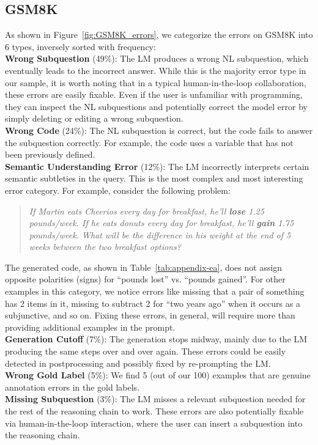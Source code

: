 \documentclass[11pt]{article}
\begin{document}
\subsection{GSM8K}
\label{sec:appendix_gsm8k_error_analysis}






As shown in Figure~\ref{fig:GSM8K_errors}, we categorize the errors on GSM8K into 6 types, inversely sorted with frequency:\\
\textbf{Wrong Subquestion} (49\%): The LM produces a wrong NL subquestion, which eventually leads to the incorrect answer. While this is the majority error type in our sample, it is worth noting that in a typical human-in-the-loop collaboration, these errors are easily fixable. Even if the user is unfamiliar with programming, they can inspect the NL subquestions and potentially correct the model error by simply deleting or editing a wrong subquestion. \\
\textbf{Wrong Code} (24\%): The NL subquestion is correct, but the code fails to answer the subquestion correctly. For example, the code uses a variable that has not been previously defined.\\
\textbf{Semantic Understanding Error} (12\%): The LM incorrectly interprets certain semantic subtleties in the query. This is the most complex and most interesting error category.
 For example, consider the following problem:
\begin{quote}
    \textit{If Martin eats Cheerios every day for breakfast, he'll \textbf{lose} 1.25 pounds/week. If he eats donuts every day for breakfast, he'll \textbf{gain} 1.75 pounds/week. What will be the difference in his weight at the end of 5 weeks between the two breakfast options?}
\end{quote}
The generated code, as shown in Table~\ref{tab:appendix-ea}, does not assign opposite polarities (signs) for ``pounds lost'' vs. ``pounds gained''. For other examples in this category, we notice errors like missing that a pair of something has 2 items in it, missing to subtract 2 for ``two years ago'' when it occurs as a subjunctive, and so on. Fixing these errors, in general, will require more than providing additional examples in the prompt.\\
\textbf{Generation Cutoff} (7\%): The generation stops midway, mainly due to the LM producing the same steps over and over again. These errors could be easily detected in postprocessing and possibly fixed by re-prompting the LM.\\
\textbf{Wrong Gold Label} (5\%): We find 5 (out of our 100) examples that are genuine annotation errors in the gold labels.\\ 
\textbf{Missing Subquestion} (3\%): The LM misses a relevant subquestion needed for the rest of the reasoning chain to work. These errors are also potentially fixable via human-in-the-loop interaction, where the user can insert a subquestion into the reasoning chain.
\end{document}
